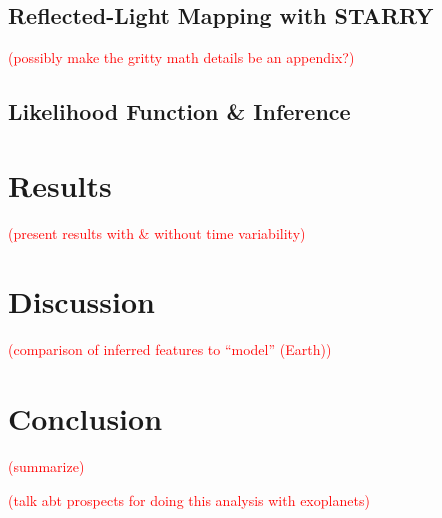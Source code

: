 \documentclass[modern]{aastex62}
\newcommand{\todo}[1]{\textcolor{red}{#1}}
\begin{document}
\subsection{Reflected-Light Mapping with STARRY}
\todo{(possibly make the gritty math details be an appendix?)}

\subsection{Likelihood Function \& Inference}

\section{Results}
\label{sec:results}

\todo{(present results with \& without time variability)}

\section{Discussion}
\label{sec:discussion}

\todo{(comparison of inferred features to ``model'' (Earth))}

\section{Conclusion}
\label{sec:conclusion}

\todo{(summarize)}

\todo{(talk abt prospects for doing this analysis with exoplanets)}


\acknowledgements{}
\pagebreak

\end{document}
